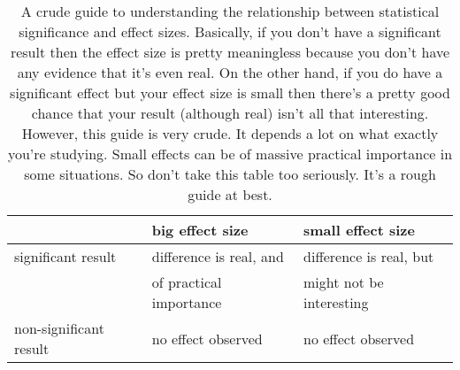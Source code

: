 \begin{table}
\caption{A crude guide to understanding the relationship between statistical significance and effect sizes. Basically, if you don't have a significant result then the effect size is pretty meaningless because you don't have any evidence that it's even real. On the other hand, if you do have a significant effect but your effect size is small then there's a pretty good chance that your result (although real) isn't all that interesting. However, this guide is very crude. It depends a lot on what exactly you're studying. Small effects can be of massive practical importance in some situations. So don't take this table too seriously. It's a rough guide at best.} \tabcapsep
\begin{center}
\begin{tabular}{l|ll}
& big effect size & small effect size \\ \hline
significant result & difference is real, and & difference is real, but  \\
                    & of practical importance & might not be interesting \\[10pt]
non-significant result & no effect observed &  no effect observed
\end{tabular}\tabcapsep
\HR
\end{center}
\end{table}

